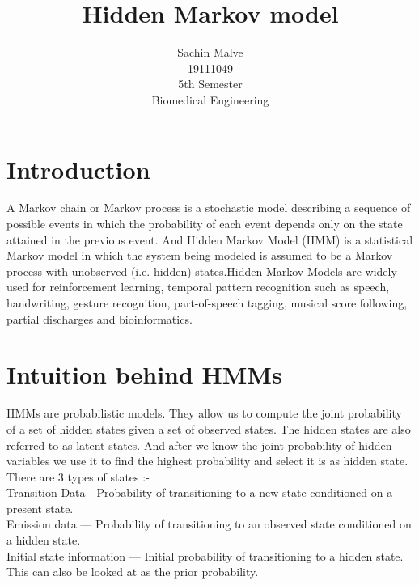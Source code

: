 \documentclass{article}
\begin{document}
\title{Hidden Markov model}


\author{Sachin Malve \\
	19111049 \\
 	5th Semester \\ 
	Biomedical Engineering\\
	}

\maketitle 
 \hrulefill

\section{Introduction}
A Markov chain or Markov process is a stochastic model describing a sequence of possible events in which the probability of each event depends only on the state attained in the previous event. And Hidden Markov Model (HMM) is a statistical Markov model in which the system being modeled is assumed to be a Markov process with unobserved (i.e. hidden) states.Hidden Markov Models are widely used for reinforcement learning, temporal pattern recognition such as speech, handwriting, gesture recognition, part-of-speech tagging, musical score following, partial discharges and bioinformatics.

\section{Intuition behind HMMs}
HMMs are probabilistic models. They allow us to compute the joint probability of a set of hidden states given a set of observed states. The hidden states are also referred to as latent states. And after we know the joint probability of hidden variables we use it to find the highest probability and select it is as hidden state.
\\
There are 3 types of states :-
\\
Transition Data - Probability of transitioning to a new state conditioned on a present state.
\\
Emission data — Probability of transitioning to an observed state conditioned on a hidden state.
\\
Initial state information — Initial probability of transitioning to a hidden state. This can also be looked at as the prior probability. 
\end{document}
